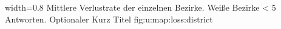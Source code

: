   {width=0.8\textwidth} %
  {Mittlere Verlustrate der einzelnen Bezirke. Weiße Bezirke < 5 Antworten.} %
  {Optionaler Kurz Titel} %
  {fig:u:map:loss:district} %



